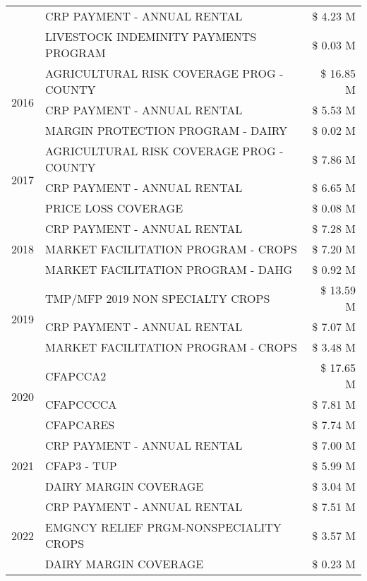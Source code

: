 \begin{tabular}{llr}
 & CRP PAYMENT - ANNUAL RENTAL & \$ 4.23 M \\
 & LIVESTOCK INDEMINITY PAYMENTS PROGRAM & \$ 0.03 M \\
\cline{1-3}
\multirow[t]{3}{*}{2016} & AGRICULTURAL RISK COVERAGE PROG - COUNTY & \$ 16.85 M \\
 & CRP PAYMENT - ANNUAL RENTAL & \$ 5.53 M \\
 & MARGIN PROTECTION PROGRAM - DAIRY & \$ 0.02 M \\
\cline{1-3}
\multirow[t]{3}{*}{2017} & AGRICULTURAL RISK COVERAGE PROG - COUNTY & \$ 7.86 M \\
 & CRP PAYMENT - ANNUAL RENTAL & \$ 6.65 M \\
 & PRICE LOSS COVERAGE & \$ 0.08 M \\
\cline{1-3}
\multirow[t]{3}{*}{2018} & CRP PAYMENT - ANNUAL RENTAL & \$ 7.28 M \\
 & MARKET FACILITATION PROGRAM - CROPS & \$ 7.20 M \\
 & MARKET FACILITATION PROGRAM - DAHG & \$ 0.92 M \\
\cline{1-3}
\multirow[t]{3}{*}{2019} & TMP/MFP 2019 NON SPECIALTY CROPS & \$ 13.59 M \\
 & CRP PAYMENT - ANNUAL RENTAL & \$ 7.07 M \\
 & MARKET FACILITATION PROGRAM - CROPS & \$ 3.48 M \\
\cline{1-3}
\multirow[t]{3}{*}{2020} & CFAPCCA2 & \$ 17.65 M \\
 & CFAPCCCCA & \$ 7.81 M \\
 & CFAPCARES & \$ 7.74 M \\
\cline{1-3}
\multirow[t]{3}{*}{2021} & CRP PAYMENT - ANNUAL RENTAL & \$ 7.00 M \\
 & CFAP3 - TUP & \$ 5.99 M \\
 & DAIRY MARGIN COVERAGE & \$ 3.04 M \\
\cline{1-3}
\multirow[t]{3}{*}{2022} & CRP PAYMENT - ANNUAL RENTAL & \$ 7.51 M \\
 & EMGNCY RELIEF PRGM-NONSPECIALITY CROPS & \$ 3.57 M \\
 & DAIRY MARGIN COVERAGE & \$ 0.23 M \\
\cline{1-3}
\bottomrule
\end{tabular}
